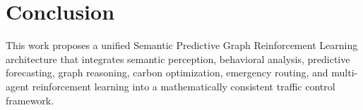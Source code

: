 \documentclass[journal]{IEEEtran}
\begin{document}
\section{Conclusion}
\label{sec:conclusion}
This work proposes a unified Semantic Predictive Graph Reinforcement Learning architecture that integrates semantic perception, behavioral analysis, predictive forecasting, graph reasoning, carbon optimization, emergency routing, and multi-agent reinforcement learning into a mathematically consistent traffic control framework.



\end{document}
